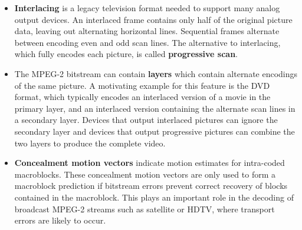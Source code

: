 \begin{itemize}
\item \textbf{Interlacing} is a legacy television format needed to support many analog output devices. An interlaced frame contains only half of the original picture data, leaving out alternating horizontal lines. Sequential frames alternate between encoding even and odd scan lines. The alternative to interlacing, which fully encodes each picture, is called \textbf{progressive scan}. 
\item The MPEG-2 bitstream can contain \textbf{layers} which contain alternate encodings of the same picture. A motivating example for this feature is the DVD format, which typically encodes an interlaced version of a movie in the primary layer, and an interlaced version containing the alternate scan lines in a secondary layer. Devices that output interlaced pictures can ignore the secondary layer and devices that output progressive pictures can combine the two layers to produce the complete video.
\item \textbf{Concealment motion vectors} indicate motion estimates for intra-coded macroblocks. These concealment motion vectors are only used to form a macroblock prediction if bitstream errors prevent correct recovery of blocks contained in the macroblock. This plays an important role in the decoding of broadcast MPEG-2 streams such as satellite or HDTV, where transport errors are likely to occur.
\end{itemize}
